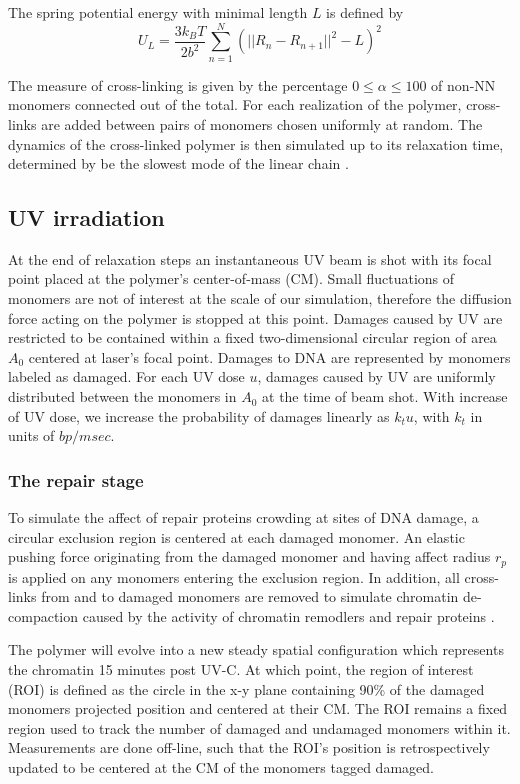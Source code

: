 \documentclass[12pt]{article}
\begin{document}
	The spring potential energy with minimal length $L$ is defined by  
	\begin{equation}
	U_L=\frac{3k_BT}{2b^2}\sum_{n=1}^N (||R_{n}-R_{n+1}||^2-L)^2
	\end{equation}
    	
	The measure of cross-linking is given by the percentage $0\leq \alpha\leq 100$ of non-NN monomers connected out of the total. For each realization of the polymer, cross-links are added between pairs of monomers chosen uniformly at random. The dynamics of the cross-linked polymer is then simulated up to its relaxation time, determined by be the slowest mode of the linear chain \cite{doi1988theory}.

	\subsection{UV irradiation}
	At the end of relaxation steps an instantaneous UV beam is shot with its focal point placed at the polymer's center-of-mass (CM). Small fluctuations of monomers are not of interest at the scale of our simulation, therefore the diffusion force acting on the polymer is stopped at this point. Damages caused by UV are restricted to be contained within a fixed two-dimensional circular region of area $A_0$ centered at laser's focal point. Damages to DNA are represented by monomers labeled as damaged. For each UV dose $u$, damages caused by UV are uniformly distributed between the monomers in $A_0$ at the time of beam shot. With increase of UV dose, we increase the probability of damages linearly as $k_tu$, with $k_t$ in units of $bp/msec$. 
	
	\subsubsection{The repair stage}	
	To simulate the affect of repair proteins crowding at sites of DNA damage, a circular exclusion region is centered at each damaged monomer. An elastic pushing force originating from the damaged monomer and having affect radius $r_p$ is applied on any monomers entering the exclusion region. In addition, all cross-links from and to damaged monomers are removed to simulate chromatin de-compaction caused by the activity of chromatin remodlers and repair proteins \cite{gaillard2003chromatin}. 
	
	The polymer will evolve into a new steady spatial configuration which represents the chromatin 15 minutes post UV-C. At which point, the region of interest (ROI) is defined as the circle in the x-y plane containing 90\% of the damaged monomers projected position and centered at their CM. The ROI remains a fixed region used to track the number of damaged and undamaged monomers within it. Measurements are done off-line, such that the ROI's position is retrospectively updated to be centered at the CM of the monomers tagged damaged.
	
\end{document}
